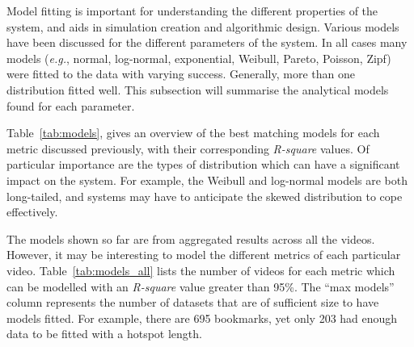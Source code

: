\documentclass[a4paper,11pt]{article}
\newcommand{\capttext}{\protect\centering\em}
\begin{document}
Model fitting is important for understanding the different properties of the system, and aids in simulation creation and algorithmic design. Various models have been discussed for the different parameters of the system. In all cases many models (\emph{e.g.}, normal, log-normal, exponential, Weibull, Pareto, Poisson, Zipf) were fitted to the data with varying success. Generally, more than one distribution fitted well. This subsection will summarise the analytical models found for each parameter.

Table~\ref{tab:models}, gives an overview of the best matching models for each metric discussed previously, with their corresponding \emph{R-square} values. Of particular importance are the types of distribution which can have a significant impact on the system. For example, the Weibull and log-normal models are both long-tailed, and systems may have to anticipate the skewed distribution to cope effectively.

The models shown so far are from aggregated results across all the videos. However, it may be interesting to model the different metrics of each particular video. Table~\ref{tab:models_all} lists the number of videos for each metric which can be modelled with an \emph{R-square} value greater than 95\%. The ``max models'' column represents the number of datasets that are of sufficient size to have models fitted. For example, there are 695 bookmarks, yet only 203 had enough data to be fitted with a hotspot length.

\begin{table}[tbp]
    \caption{\capttext Metrics for individual videos and their corresponding distributions}
    \label{tab:models_all}
\end{table}
\end{document}
